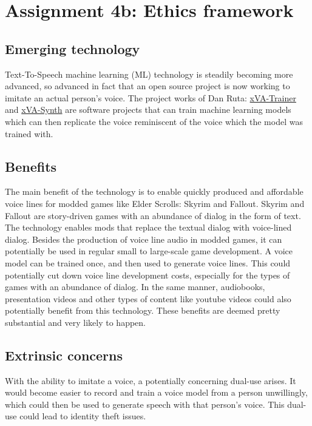\section*{Assignment 4b: Ethics framework} 

\subsection*{Emerging technology}
Text-To-Speech machine learning (ML) technology is steadily becoming more advanced, so advanced in fact that an open source project is now working to imitate an actual person's voice.
The project works of Dan Ruta: \href{https://github.com/DanRuta/xva-trainer}{xVA-Trainer} and \href{https://github.com/DanRuta/xVA-Synth}{xVA-Synth} are software projects that can train machine learning models which can then replicate the voice reminiscent of the voice which the model was trained with.

\subsection*{Benefits}
The main benefit of the technology is to enable quickly produced and affordable voice lines for modded games like Elder Scrolls: Skyrim and Fallout. 
Skyrim and Fallout are story-driven games with an abundance of dialog in the form of text. The technology enables mods that replace the textual dialog with voice-lined dialog.
Besides the production of voice line audio in modded games, it can potentially be used in regular small to large-scale game development. 
A voice model can be trained once, and then used to generate voice lines.
This could potentially cut down voice line development costs, especially for the types of games with an abundance of dialog.
In the same manner, audiobooks, presentation videos and other types of content like youtube videos could also potentially benefit from this technology.
These benefits are deemed pretty substantial and very likely to happen. 

\subsection*{Extrinsic concerns}
With the ability to imitate a voice, a potentially concerning dual-use arises. 
It would become easier to record and train a voice model from a person unwillingly, which could then be used to generate speech with that person's voice.
This dual-use could lead to identity theft issues. 

